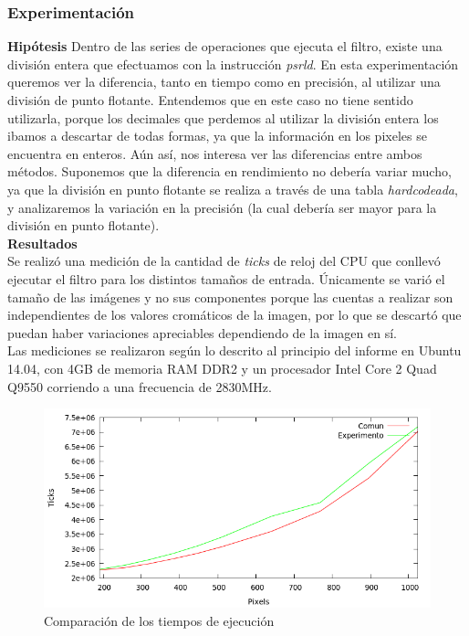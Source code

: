 \documentclass[a4paper]{article}
\begin{document}
\subsubsection{Experimentación}
\textbf{Hipótesis}
\newline
Dentro de las series de operaciones que ejecuta el filtro, existe una división entera que efectuamos con la instrucción \textit{psrld}. En esta experimentación queremos ver la diferencia, tanto en tiempo como en precisión, al utilizar una división de punto flotante. Entendemos que en este caso no tiene sentido utilizarla, porque los decimales que perdemos al utilizar la división entera los ibamos a descartar de todas formas, ya que la información en los pixeles se encuentra en enteros. Aún así, nos interesa ver las diferencias entre ambos métodos. Suponemos que la diferencia en rendimiento no debería variar mucho, ya que la división en punto flotante se realiza a través de una tabla \textit{hardcodeada}, y analizaremos la variación en la precisión (la cual debería ser mayor para la división en punto flotante).
\newline
\\
\textbf{Resultados}
\\Se realizó una medición de la cantidad de \textit{ticks} de reloj del CPU que conllevó ejecutar el filtro para los distintos tamaños de entrada. Únicamente se varió el tamaño de las imágenes y no sus componentes porque las cuentas a realizar son independientes de los valores cromáticos de la imagen, por lo que se descartó que puedan haber variaciones apreciables dependiendo de la imagen en sí.
\\Las mediciones se realizaron según lo descrito al principio del informe en Ubuntu 14.04, con 4GB de memoria RAM DDR2 y un procesador Intel Core 2 Quad Q9550 corriendo a una frecuencia de 2830MHz.
\\

\begin{figure}[H]
  \begin{center}
	\includegraphics[scale=0.77]{imagenes/pixelarExp.png}
	\caption{Comparación de los tiempos de ejecución}
	\label{pixelar_exp}
  \end{center}
\end{figure}
\end{document}
